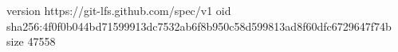 version https://git-lfs.github.com/spec/v1
oid sha256:4f0f0b044bd71599913dc7532ab6f8b950c58d599813ad8f60dfc6729647f74b
size 47558
